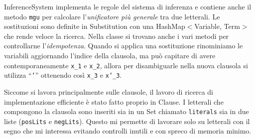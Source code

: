 \documentclass[a4paper,11pt]{article} %
\newcommand{\sintassi}{\texttt}
\newcommand{\classe}{\textsf}
\newcommand{\metodo}{\texttt}
\newcommand{\cod}{\lstset{basicstyle=\ttfamily}\lstinline}
\begin{document}
\classe{InferenceSystem} %
implementa %
le regole del
sistema di inferenza e contiene anche il metodo \metodo{mgu} %
per calcolare l'\emph{unificatore più generale} 
tra due letterali. 
Le sostituzioni sono definite in \classe{Substitution}
con una \classe{HashMap}$<$\classe{Variable}, \classe{Term}$>$ che
rende veloce la ricerca. %
Nella classe si trovano anche i vari metodi per controllarne l'\emph{idempotenza}.
Quando si applica una sostituzione rinominiamo le variabili aggiornando
l'indice della clausola, ma può capitare di avere contemporaneamente
\sintassi{x\_1} e \sintassi{x\_2}, allora per disambiguarle nella nuova
clausola si utilizza ``\sintassi{'}'' ottenendo così
\sintassi{x\_3} e \sintassi{x'\_3}.



Siccome %
si lavora principalmente sulle clausole,
il lavoro di ricerca di %
implementazione efficiente è stato
fatto proprio in \classe{Clause}. %
I letterali che compongono la clausola
sono inseriti
sia in un \classe{Set} chiamato \cod{literals} 
sia in due liste (\cod{posLits} e \cod{negLits}). 
Questo mi permette di 
lavorare solo su letterali con il segno che mi interessa 
evitando controlli inutili e con spreco di memoria minimo. 
\end{document}
